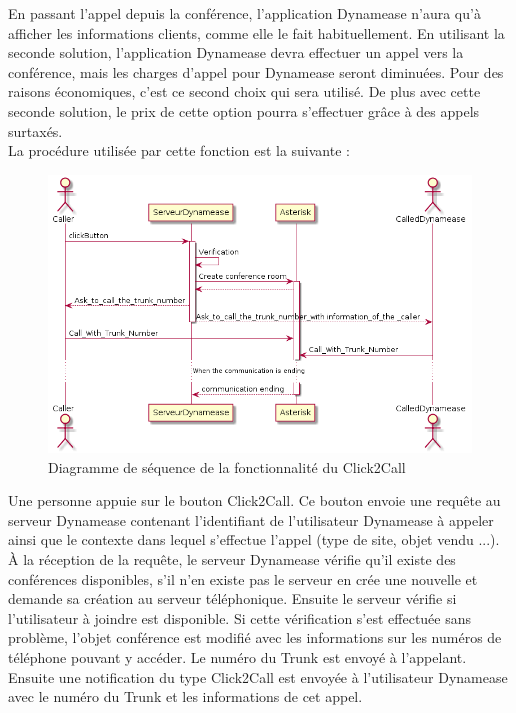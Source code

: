 En passant l'appel depuis la conférence, l'application Dynamease n'aura qu'à afficher les informations clients, comme elle le fait habituellement. En utilisant la seconde solution, l'application Dynamease devra effectuer un appel vers la conférence, mais les charges d'appel pour Dynamease seront diminuées. Pour des raisons économiques, c'est ce second choix qui sera utilisé. De plus avec cette seconde solution, le prix de cette option pourra s'effectuer grâce à des appels surtaxés.\\

La procédure utilisée par cette fonction est la suivante :

\begin{figure}[!h]
	\centering
	\includegraphics[scale=0.7]{img/sequence_click2call.png}
	\caption{\label{sequence_click2call} Diagramme de séquence de la fonctionnalité du Click2Call}
\end{figure}

Une personne appuie sur le bouton Click2Call. Ce bouton envoie une requête au serveur Dynamease contenant l'identifiant de l'utilisateur Dynamease à appeler ainsi que le contexte dans lequel s'effectue l'appel (type de site, objet vendu ...). À la réception de la requête, le serveur Dynamease vérifie qu'il existe des conférences disponibles, s'il n'en existe pas le serveur en crée une nouvelle et demande sa création au serveur téléphonique. Ensuite le serveur vérifie si l'utilisateur à joindre est disponible. Si cette vérification s'est effectuée sans problème, l'objet conférence est modifié avec les informations sur les numéros de téléphone pouvant y accéder. Le numéro du Trunk est envoyé à l'appelant. Ensuite une notification du type Click2Call est envoyée à l'utilisateur Dynamease avec le numéro du Trunk et les informations de cet appel.

